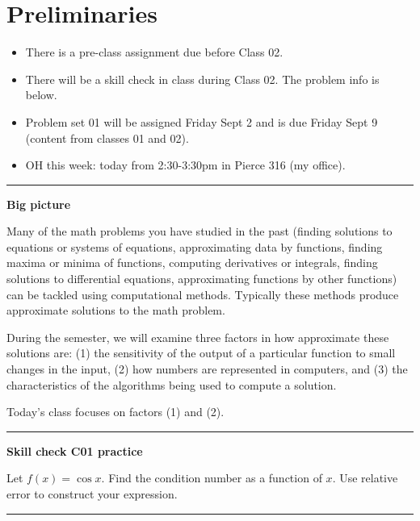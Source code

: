 \documentclass[12pt,letterpaper,noanswers]{exam}
\begin{document}
 \pdfpageheight 11in 
  \pdfpagewidth 8.5in

\noindent 



\section{Preliminaries}
\begin{itemize}
\itemsep0pt
\item There is a pre-class assignment due before Class 02.
\item There will be a skill check in class during Class 02.  The problem info is below.
\item Problem set 01 will be assigned Friday Sept 2 and is due Friday Sept 9 (content from classes 01 and 02).
\item OH this week: today from 2:30-3:30pm in Pierce 316 (my office).
\end{itemize}

\hrule
\vspace{0.2cm}


\noindent\textbf{Big picture}

Many of the math problems you have studied in the past (finding solutions to equations or systems of equations, approximating data by functions, finding maxima or minima of functions, computing derivatives or integrals, finding solutions to differential equations, approximating functions by other functions) can be tackled using computational methods.  Typically these methods produce approximate solutions to the math problem.

During the semester, we will examine three factors in how approximate these solutions are: (1) the sensitivity of the output of a particular function to small changes in the input, (2) how numbers are represented in computers, and (3) the characteristics of the algorithms being used to compute a solution. 

Today's class focuses on factors (1) and (2).

\vspace{0.2cm}
\hrule
\vspace{0.2cm}

\noindent \textbf{Skill check C01 practice}

Let $f(x) = 
\cos x$.  Find the condition number as a function of $x$.  Use relative error to construct your expression.


\vspace{0.2cm}
\hrule
\vspace{0.2cm}
\end{document}
